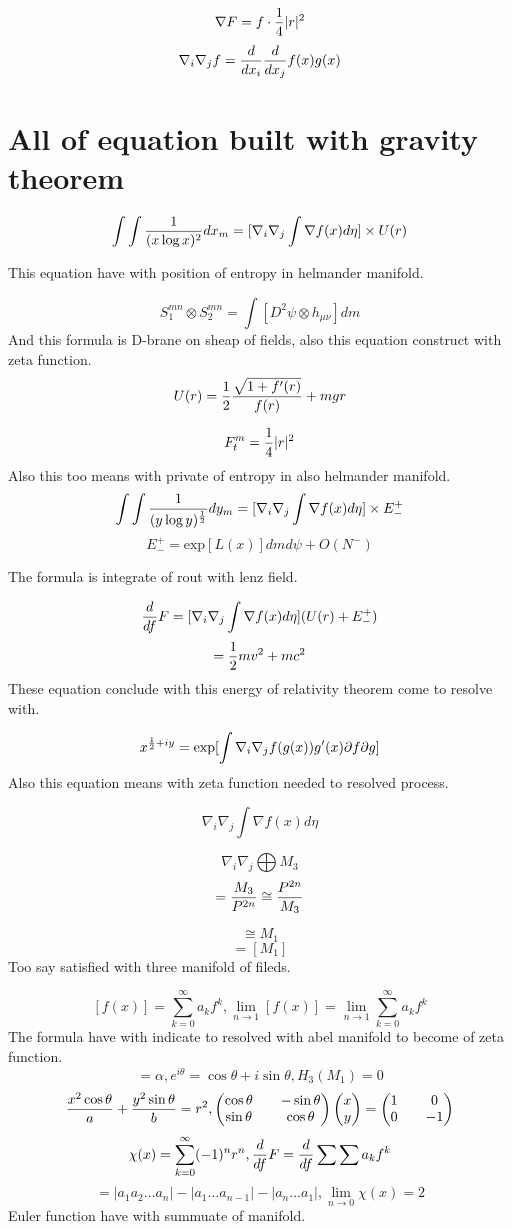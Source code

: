 \documentclass{jsarticle}
\begin{document}
		  $$ \nabla F = f \cdot {1 \over 4}|r|^2$$
		  $$ \nabla_{i}\nabla_{j} f = {d \over dx_i}
{d \over dx_j}f(x)g(x) $$

\section{All of equation built with gravity theorem}

$$ \int \int {1 \over (x \log x)^2}dx_m  
 = [\nabla_{i}\nabla_{j}\int \nabla f(x)d\eta] \times U(r) $$

 This equation have with position of entropy in helmander manifold.

 $$ S^{mn}_1 \otimes S^{mn}_2 = \int [D^2 \psi \otimes h_{\mu\nu}]dm $$
 And this formula is D-brane on sheap of fields, also this equation construct 
 with zeta function.
 $$ U(r) = {1 \over 2}{\sqrt{1 + f'(r)} \over f(r)} + mgr $$

 $$ F^m_t = {1 \over 4}|r|^2 $$
 Also this too means with private of entropy in also helmander manifold.
 $$ \int \int {1 \over (y \log y)^{1 \over 2}}dy_m  
  = [\nabla_{i}\nabla_{j} \int \nabla f(x) d\eta] \times E^{+}_{-} $$
 $$ E^{+}_{-} = \mathrm{exp}[L(x)]dmd\psi + O(N^{-}) $$

 The formula is integrate of rout with lenz field.

 $$ {d \over df}F = [\nabla_{i}\nabla_{j}\int \nabla f(x) d\eta](U(r) + E^{+}_{-}) $$
 $$ = {1 \over 2}mv^2 + mc^2 $$
 These equation conclude with this energy of relativity theorem come to resolve with.

 $$ x^{{1 \over 2} + iy} = \mathrm{exp}[\int \nabla_{i}\nabla_{j}f(g(x))g'(x)\partial f \partial g] $$
 Also this equation means with zeta function needed to resolved process.

 $$ \nabla_{i}\nabla_{j} \int \nabla f(x) d\eta $$

 $$ \nabla_{i}\nabla_{j} \bigoplus M_3 $$
 $$ = {M_3 \over P^{2n}} \cong {P^{2n} \over M_3} $$

 $$ \cong M_1 $$
 $$ = [M_1] $$
 Too say satisfied with three manifold of fileds.

 $$ [f(x)] = \sum_{k=0}^{\infty}a_kf^k, \lim_{n \to 1}[f(x)] = \lim_{n \to 1}\sum_{k=0}^{\infty}a_kf^k $$
 The formula have with indicate to resolved with abel manifold to become of zeta function.
 $$ = \alpha, e^{i\theta} = \cos \theta + i\sin \theta, H_3(M_1) = 0 $$
 $$ {x^2 \cos \theta \over a} +
 {y^2 \sin \theta \over b} = r^2, \begin{pmatrix} \cos \theta && - \sin \theta \\
 \sin \theta && \cos \theta \end{pmatrix} \begin{pmatrix} x \\
 y \end{pmatrix} = \begin{pmatrix} 1 && 0 \\
 0 && - 1 \end{pmatrix} $$
 $$ \chi(x) = \sum_{k=0}^{\infty} (-1)^n r^n, {d \over df}F = {d \over df}\sum\sum a_kf^k $$
 $$ = |a_1a_2\dots a_n| - |a_1 \dots a_{n-1}| - |a_n \dots a_1|, \lim_{n \to 0}\chi (x) = 2 $$
 Euler function have with summuate of manifold.
\end{document}
